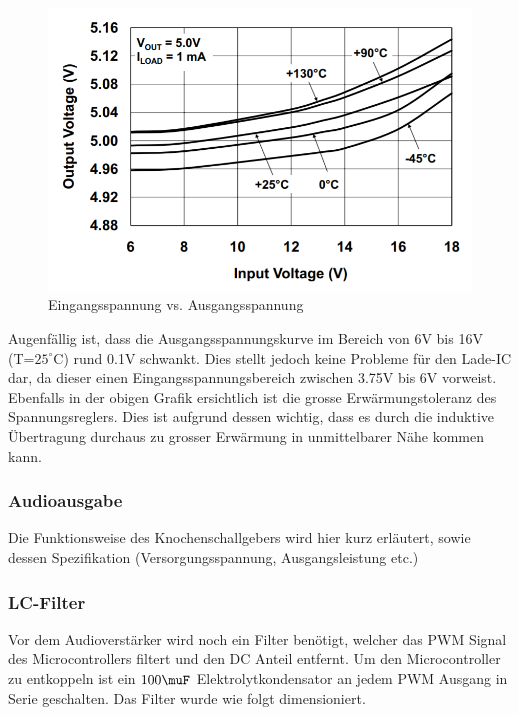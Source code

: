 \begin{figure}[H]
	\begin{center}
		\includegraphics[width=120mm]{data/Linearregler_5V.png}
		\caption[MCP1703A Linearregler Spannungsverhalten]{Eingangsspannung vs. Ausgangsspannung \cite{MCP1703LinearRegulator}} %
		\label{fig:Linearregler 5V}
	\end{center}
\end{figure} 

Augenfällig ist, dass die Ausgangsspannungskurve im Bereich von 6V bis 16V (T=$25^\circ\text{C}$) rund 0.1V schwankt. Dies stellt jedoch keine Probleme für den Lade-IC dar, da dieser einen Eingangsspannungsbereich zwischen 3.75V bis 6V vorweist. Ebenfalls in der obigen Grafik ersichtlich ist die grosse Erwärmungstoleranz des Spannungsreglers. Dies ist aufgrund dessen wichtig, dass es durch die induktive Übertragung durchaus zu grosser Erwärmung in unmittelbarer Nähe kommen kann.

\subsubsection{Audioausgabe}
Die Funktionsweise des Knochenschallgebers wird hier kurz erläutert, sowie dessen Spezifikation (Versorgungsspannung, Ausgangsleistung etc.)

\subsubsection{LC-Filter}
Vor dem Audioverstärker wird noch ein Filter benötigt, welcher das PWM Signal des Microcontrollers filtert und den DC Anteil entfernt. Um den Microcontroller zu entkoppeln ist ein $100\muF$ Elektrolytkondensator an jedem PWM Ausgang in Serie geschalten. Das Filter wurde wie folgt dimensioniert. 

